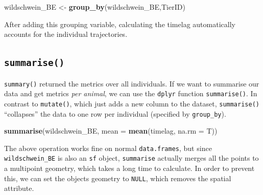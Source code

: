 \documentclass[]{book}
\newenvironment{Shaded}{\begin{snugshade}}{\end{snugshade}}
\newcommand{\KeywordTok}[1]{\textcolor[rgb]{0.13,0.29,0.53}{\textbf{#1}}}
\newcommand{\DataTypeTok}[1]{\textcolor[rgb]{0.13,0.29,0.53}{#1}}
\newcommand{\StringTok}[1]{\textcolor[rgb]{0.31,0.60,0.02}{#1}}
\newcommand{\OperatorTok}[1]{\textcolor[rgb]{0.81,0.36,0.00}{\textbf{#1}}}
\newcommand{\NormalTok}[1]{#1}
\begin{document}
\begin{Shaded}
\begin{Highlighting}[]
\NormalTok{wildschwein_BE <-}\StringTok{ }\KeywordTok{group_by}\NormalTok{(wildschwein_BE,TierID)}
\end{Highlighting}
\end{Shaded}

After adding this grouping variable, calculating the timelag
automatically accounts for the individual trajectories.

\begin{Shaded}
\end{Shaded}

\subsection{\texorpdfstring{\texttt{summarise()}}{summarise()}}\label{summarise}

\texttt{summary()} returned the metrics over all individuals. If we want
to summarise our data and get metrics \emph{per animal}, we can use the
\texttt{dplyr} function \texttt{summarise()}. In contrast to
\texttt{mutate()}, which just adds a new column to the dataset,
\texttt{summarise()} ``collapses'' the data to one row per individual
(specified by \texttt{group\_by}).

\begin{Shaded}
\begin{Highlighting}[]
\KeywordTok{summarise}\NormalTok{(wildschwein_BE, }\DataTypeTok{mean =} \KeywordTok{mean}\NormalTok{(timelag, }\DataTypeTok{na.rm =}\NormalTok{ T))}
\end{Highlighting}
\end{Shaded}

The above operation works fine on normal \texttt{data.frames}, but since
\texttt{wildschwein\_BE} is also an \texttt{sf} object,
\texttt{summarise} actually merges all the points to a multipoint
geometry, which takes a long time to calculate. In order to prevent
this, we can set the objects geometry to \texttt{NULL}, which removes
the spatial attribute.
\end{document}

